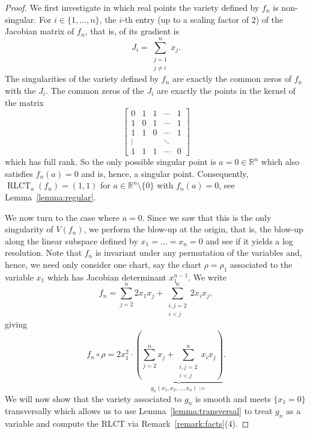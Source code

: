 \documentclass[11pt]{amsart}
\DeclareMathOperator{\rlct}{RLCT}
\numberwithin{equation}{section}
\theoremstyle{plain}
\theoremstyle{definition}
\newcommand{\R}{\mathbb{R}}
\begin{document}
\begin{proof}
    We first investigate in which real points the variety defined by $f_n$ is non-singular. For $i \in \{1,\ldots,n\}$, the $i$-th entry (up to a scaling factor of $2$) of the Jacobian matrix of $f_n$, that is, of its gradient is
    \[
    J_i = \sum_{\substack{j = 1\\ j \neq i}}^n x_j.
    \]
    The singularities of the variety defined by $f_n$ are exactly the common zeros of $f_n$ with the $J_i$. The common zeros of the $J_i$ are exactly the points in the kernel of the matrix
    \begin{equation}\label{equation:matrix}
    \begin{bmatrix}
        0 & 1 & 1 & \cdots & 1 \\
        1 & 0 & 1 & \cdots & 1 \\
        1 & 1 & 0 & \cdots & 1 \\
        \vdots &  &  & \ddots & \\
        1 & 1 & 1 & \cdots & 0
    \end{bmatrix}
    \end{equation}
    which has full rank. So the only possible singular point is $a = 0 \in \R^n$ which also satisfies $f_n(a) = 0$ and is, hence, a singular point. Consequently, $\rlct_a(f_n) = (1,1)$ for $a \in \R^n\setminus \{0\}$ with $f_n(a) = 0$, see Lemma~\ref{lemma:regular}.

    We now turn to the case where $a = 0$. Since we saw that this is the only singularity of $V(f_n)$, we perform the blow-up at the origin, that is, the blow-up along the linear subspace defined by $x_1 = \ldots = x_n = 0$ and see if it yields a log resolution. Note that $f_n$ is invariant under any permutation of the variables and, hence, we need only consider one chart, say the chart $\rho = \rho_1$ associated to the variable $x_1$ which has Jacobian determinant $x_1^{n-1}$. We write
    \[
    f_n = \sum_{j = 2}^n 2x_1x_j + \sum_{\substack{i,j = 2 \\ i<j}}^n 2x_ix_j,
    \]
    giving
    \[
    f_n \circ \rho = 2x_1^2\cdot \underbrace{\left(  \sum_{j = 2}^n x_j + \sum_{\substack{i,j = 2 \\ i <j}}^n x_ix_j\right)}_{g_n(x_1,x_2,\ldots,x_n) :=}.
    \]
    We will now show that the variety associated to $g_n$ is smooth and meets $\{x_1 = 0\}$ transversally which allows us to use Lemma~\ref{lemma:transversal} to treat $g_n$ as a variable and compute the RLCT via Remark~\ref{remark:facts}(4). 


\end{proof}
\end{document}
